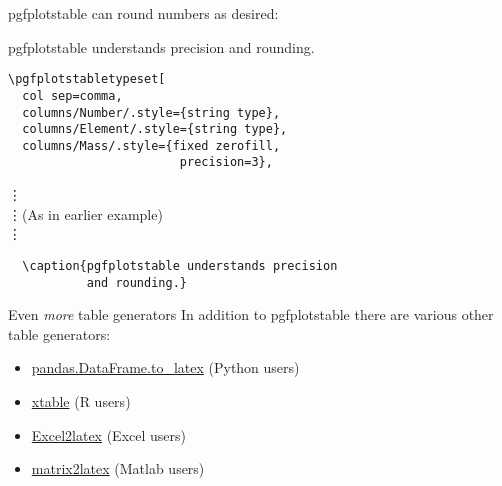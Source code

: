 \begin{frame}{}
  pgfplotstable can round numbers as desired:
  \begin{table}
  	\caption{pgfplotstable understands precision and rounding.}
  \end{table}
\end{frame}

\begin{frame}[fragile]{}
  \begin{lstlisting}
\pgfplotstabletypeset[
  col sep=comma,
  columns/Number/.style={string type},
  columns/Element/.style={string type},
  columns/Mass/.style={fixed zerofill, 
                        precision=3},
  \end{lstlisting}
\vspace{-0.5cm}\hspace{0.25cm}\vdots \\
\hspace{0.25cm}\vdots\quad(As in earlier example) \\
\hspace{0.25cm}\vdots
  \begin{lstlisting}
  \caption{pgfplotstable understands precision
           and rounding.}
  \end{lstlisting}
\end{frame}

\begin{frame}{Even \textit{more} table generators}
  In addition to pgfplotstable there are various other table generators:
  \begin{itemize}
    \item \href{https://pandas.pydata.org/pandas-docs/stable/generated/pandas.DataFrame.to_latex.html}%
	    {pandas.DataFrame.to\_latex} (Python users)
    \item \href{https://www.rdocumentation.org/packages/xtable/versions/1.8-3/topics/xtable}%
    	{xtable} (R users)
    \item \href{https://ctan.org/pkg/excel2latex?lang=en}{Excel2latex}
    	(Excel users)
    \item \href{https://uk.mathworks.com/matlabcentral/fileexchange/4894-matrix2latex?s_tid=FX_rc2_behav}%
	    {matrix2latex} (Matlab users)
  \end{itemize}
\end{frame}

